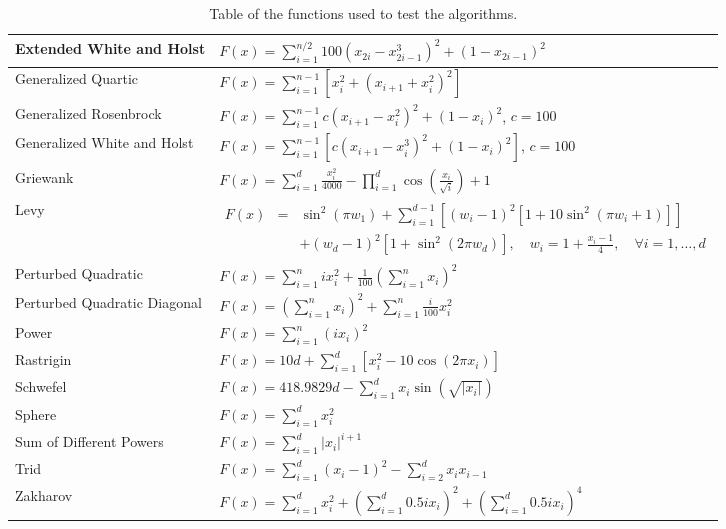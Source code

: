 \begin{table}[H]
\begin{tabular}{|l|l|}
		Extended White and Holst & $F(x)=\sum_{i=1}^{n / 2} 100\left(x_{2 i}-x_{2 i-1}^{3}\right)^{2}+\left(1-x_{2 i-1}\right)^{2}$\\ \hline
		Generalized Quartic & $F(x)=\sum_{i=1}^{n-1} \left[x_{i}^{2}+\left(x_{i+1}+x_{i}^{2}\right)^{2}\right]$\\ \hline
		Generalized Rosenbrock & $F(x)=\sum_{i=1}^{n-1} c\left(x_{i+1}-x_{i}^{2}\right)^{2}+\left(1-x_{i}\right)^{2}$, $c=100$\\ \hline
		Generalized White and Holst & $F(x)=\sum_{i=1}^{n-1} \left[c\left(x_{i+1}-x_{i}^{3}\right)^{2}+\left(1-x_{i}\right)^{2}\right]$, $c=100$\\ \hline
		Griewank & $F(x)=\sum_{i=1}^{d} \frac{x_{i}^{2}}{4000}-\prod_{i=1}^{d} \cos \left(\frac{x_{i}}{\sqrt{i}}\right)+1$\\ \hline
		Levy & $\begin{array} {lcl}
			F(x) & = & \sin ^{2}\left(\pi w_{1}\right)+\sum_{i=1}^{d-1}\left[\left(w_{i}-1\right)^{2}\left[1+10 \sin ^{2}\left(\pi w_{i}+1\right)\right]\right] \\ & & + \left(w_{d}-1\right)^{2}\left[1+\sin ^{2}\left(2 \pi w_{d}\right)\right], \quad w_{i}=1+\frac{x_{i}-1}{4}, \quad \forall i=1, \dots, d
		\end{array} $\\ \hline
		Perturbed Quadratic & $F(x)=\sum_{i=1}^{n} i x_{i}^{2}+\frac{1}{100}\left(\sum_{i=1}^{n} x_{i}\right)^{2}$\\ \hline
		Perturbed Quadratic Diagonal & $F(x)=\left(\sum_{i=1}^{n} x_{i}\right)^{2}+\sum_{i=1}^{n} \frac{i}{100} x_{i}^{2}$\\ \hline
		Power & $F(x)=\sum_{i=1}^{n}\left(i x_{i}\right)^{2}$\\ \hline
		Rastrigin & $ F(x)=10 d+\sum_{i=1}^{d}\left[x_{i}^{2}-10 \cos \left(2 \pi x_{i}\right)\right] $\\ \hline
		Schwefel & $ F(x)=418.9829 d-\sum_{i=1}^{d} x_{i} \sin \left(\sqrt{\left|x_{i}\right|}\right) $\\ \hline
		Sphere & $ F(x)=\sum_{i=1}^{d} x_{i}^{2} $\\ \hline
		Sum of Different Powers & $ F(x)=\sum_{i=1}^{d}\left|x_{i}\right|^{i+1}$\\ \hline
		Trid & $F(x)=\sum_{i=1}^{d}\left(x_{i}-1\right)^{2}-\sum_{i=2}^{d} x_{i} x_{i-1}$\\ \hline
		Zakharov & $F(x)=\sum_{i=1}^{d} x_{i}^{2}+\left(\sum_{i=1}^{d} 0.5 i x_{i}\right)^{2}+\left(\sum_{i=1}^{d} 0.5 i x_{i}\right)^{4}$\\ \hline
	\end{tabular}
	\renewcommand{\arraystretch}{1}
	\caption[Table of the functions.]{Table of the functions used to test the algorithms.}
	\label{ListFunctions}
\end{table}

